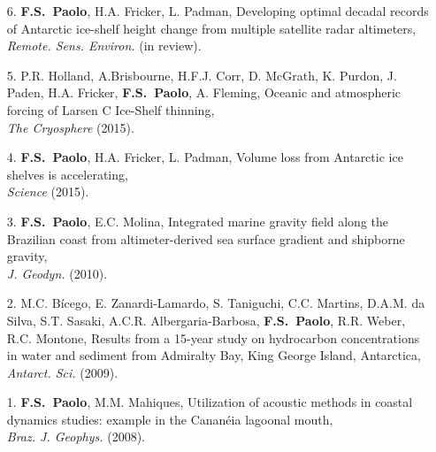 \documentclass[a4paper,11pt]{article}
\begin{document}
\begin{minipage}{\textwidth}
\begin{flushleft}
\begin{enumerate}
  \item [6.] {\bf F.S.~Paolo}, H.A. Fricker, L. Padman, Developing optimal
        decadal records of Antarctic ice-shelf height change from multiple
        satellite radar altimeters,\\ {\it Remote. Sens. Environ.} (in review).
  \item [5.] P.R. Holland, A.Brisbourne, H.F.J. Corr, D. McGrath, K. Purdon, 
        J. Paden, H.A. Fricker, {\bf F.S.~Paolo}, A. Fleming, Oceanic and 
        atmospheric forcing of Larsen C Ice-Shelf thinning,\\ {\it The Cryosphere} 
        (2015).
  \item [4.] {\bf F.S.~Paolo}, H.A. Fricker, L. Padman, Volume loss 
        from Antarctic ice shelves is accelerating,\\ {\it Science} (2015).
  \item [3.] {\bf F.S.~Paolo}, E.C. Molina, Integrated marine 
        gravity field along the Brazilian coast from altimeter-derived sea 
        surface gradient and shipborne gravity,\\ {\it J. Geodyn.} (2010).
  \item [2.] M.C. B\'icego, E. Zanardi-Lamardo, S. Taniguchi, C.C. Martins, 
        D.A.M. da Silva, S.T. Sasaki, A.C.R. Albergaria-Barbosa, {\bf F.S.~Paolo},
        R.R. Weber, R.C. Montone, Results from a 15-year 
        study on hydrocarbon concentrations in water and sediment from 
        Admiralty Bay, King George Island, Antarctica,\\ {\it Antarct. Sci.} 
        (2009).
  \item [1.] {\bf F.S.~Paolo}, M.M. Mahiques, Utilization of 
        acoustic methods in coastal dynamics studies: example in the 
        Canan\'eia lagoonal mouth,\\ {\it Braz. J. Geophys.} (2008).
\end{enumerate}
\end{flushleft}
\end{minipage}
\end{document}

